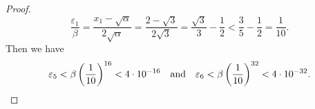 \begin{enumerate}
\begin{proof}
    \begin{equation*}
      \frac{\varepsilon_1}\beta = \frac{x_1-\sqrt\alpha}{2\sqrt\alpha}
      = \frac{2-\sqrt3}{2\sqrt3} = \frac{\sqrt3}3 - \frac12
      < \frac35 - \frac12 = \frac1{10}.
    \end{equation*}
    Then we have
    \begin{equation*}
      \varepsilon_5 < \beta\left(\frac1{10}\right)^{16} < 4\cdot10^{-16}
      \quad\text{and}\quad
      \varepsilon_6 < \beta\left(\frac1{10}\right)^{32} < 4\cdot10^{-32}.
      \qedhere
    \end{equation*}
  \end{proof}
\end{enumerate}


